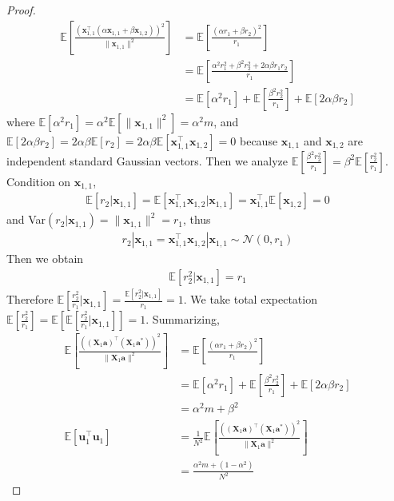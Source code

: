 \documentclass{article}
\theoremstyle{plain}
\theoremstyle{definition}
\theoremstyle{remark}
\begin{document}
\begin{proof}
\begin{align}
        \mathbb{E}\left[ \frac{(\mathbf{x}_{1,1}^\top(\alpha \mathbf{x}_{1,1} + \beta \mathbf{x}_{1,2}))^2}{\| \mathbf{x}_{1,1} \|^2} \right]  & = \mathbb{E}\left[ \frac{(\alpha r_1+\beta r_2)^2}{r_1} \right] \\
        & = \mathbb{E}\left[ \frac{\alpha^2 r_1^2 +\beta^2 r_2^2 + 2\alpha \beta r_1 r_2}{r_1} \right]\\
        & = \mathbb{E}\left[ \alpha^2 r_1\right] + \mathbb{E}\left[ \frac{\beta^2 r_2^2}{r_1}\right] + \mathbb{E}\left[ 2\alpha \beta r_2\right]
    \end{align}
    where $\mathbb{E}\left[ \alpha^2 r_1\right] = \alpha^2 \mathbb{E}\left[ \| \mathbf{x}_{1,1}\|^2 \right]=\alpha^2 m$, and $\mathbb{E}\left[ 2\alpha \beta r_2\right] = 2\alpha \beta \mathbb{E}\left[ r_2\right]=2\alpha \beta \mathbb{E}\left[ \mathbf{x}_{1,1}^\top \mathbf{x}_{1,2} \right]=0$ because $\mathbf{x}_{1,1}$ and $\mathbf{x}_{1,2}$ are independent standard Gaussian vectors. Then we analyze $\mathbb{E}\left[ \frac{\beta^2 r_2^2}{r_1}\right] = \beta^2 \mathbb{E}\left[ \frac{r_2^2}{r_1}\right]$. Condition on $\mathbf{x}_{1,1}$, 
    \begin{align}
        \mathbb{E}\left[ r_2 | \mathbf{x}_{1,1}\right]=\mathbb{E}\left[ \mathbf{x}_{1,1}^\top \mathbf{x}_{1,2} | \mathbf{x}_{1,1}\right]= \mathbf{x}_{1,1}^\top \mathbb{E}\left[ \mathbf{x}_{1,2} \right] = 0
    \end{align}
    and Var$(r_2|\mathbf{x}_{1,1}) = \| \mathbf{x}_{1,1} \|^2=r_1$, thus
    \begin{align}
        r_2|\mathbf{x}_{1,1} = \mathbf{x}_{1,1}^\top \mathbf{x}_{1,2} | \mathbf{x}_{1,1}  \sim \mathcal{N}(0,r_1) \label{x-1-x-2-con-x-1}
    \end{align} Then we obtain  
    \begin{align}
        \mathbb{E}\left[ r_2^2 | \mathbf{x}_{1,1}\right]=r_1 \label{x-1-x-2-square-given-x1}
    \end{align}
    Therefore $\mathbb{E}\left[ \frac{r_2^2}{r_1} | \mathbf{x}_{1,1}\right]=\frac{\mathbb{E}\left[ r_2^2 | \mathbf{x}_{1,1} \right]}{r_1}= 1$. We take total expectation $\mathbb{E}\left[ \frac{r_2^2}{r_1}\right] = \mathbb{E}\left[ \mathbb{E}\left[ \frac{r_2^2}{r_1} | \mathbf{x}_{1,1}\right] \right]=1$. Summarizing,
    \begin{align}
         \mathbb{E}\left[\frac{((\mathbf{X}_1 \mathbf{a})^\top(\mathbf{X}_1 \mathbf{a}^*))^2}{\|  \mathbf{X}_1 \mathbf{a} \|^2} \right] & =  \mathbb{E}\left[ \frac{(\alpha r_1+\beta r_2)^2}{r_1} \right]  \\
        & =  \mathbb{E}\left[ \alpha^2 r_1\right] + \mathbb{E}\left[ \frac{\beta^2 r_2^2}{r_1}\right] + \mathbb{E}\left[ 2\alpha \beta r_2\right]  \\
        & = 
   \alpha^2 m + \beta^2  \label{E-u1-u1-1} \\
   \mathbb{E}\left[ \mathbf{u}_1^\top \mathbf{u}_1 \right] & = \frac{1}{N^2}\mathbb{E}\left[\frac{((\mathbf{X}_1 \mathbf{a})^\top(\mathbf{X}_1 \mathbf{a}^*))^2}{\|  \mathbf{X}_1 \mathbf{a} \|^2} \right]\\&= \frac{\alpha^2 m + (1-\alpha^2)}{N^2} \label{u1-u1}
    \end{align}

\end{proof}
\end{document}
